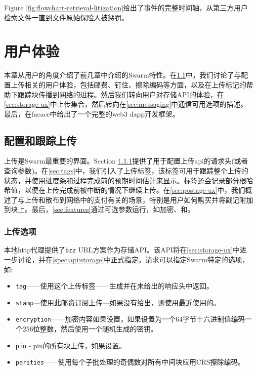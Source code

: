 Figure \ref{fig:flowchart-retrieval-litigation}给出了事件的完整时间轴，从第三方用户检索文件一直到文件原始保险人被惩罚。





\chapter{用户体验}\label{sec:ux}

本章从用户的角度介绍了前几章中介绍的Swarm特性。在\ref{sec:upload}中，我们讨论了与配置上传相关的用户体验，包括邮费、钉住、擦除编码等方面，以及在上传标记的帮助下跟踪块传播到网络的进程。然后我们转向用户对存储API的体验，在\ref{sec:storage-ux}中上传集合，然后转向在\ref{sec:messaging}中通信可用选项的描述。最后，在facace中给出了一个完整的web3 dapp开发框架。

\section{配置和跟踪上传\statusgreen}\label{sec:upload}

\green{}

上传是Swarm最重要的界面。Section \ref{sec:headers}提供了用于配置上传api的请求头(或者查询参数)。在\ref{sec:tags}中，我们引入了上传标签，该标签可用于跟踪整个上传的状态，并使用进度条和过程完成前的预期时间估计来显示。标签还会记录部分根哈希值，以便在上传完成前被中断的情况下继续上传。在\ref{sec:postage-ux}中，我们概述了与上传和散布到网络中的支付有关的场景，特别是用户如何购买并将戳记附加到块上。最后，\ref{sec:features}通过可选参数运行，如加密、和。

\subsection{上传选项\statusgreen}\label{sec:headers}

本地http代理提供了\lstinline{bzz} URL方案作为存储API。该API将在\ref{sec:storage-ux}中进一步讨论，并在\ref{spec:api:storage}中正式指定。请求可以指定Swarm特定的选项，如:

\begin{itemize}
\item \lstinline{tag}——使用这个上传标签——生成并在未给出的响应头中返回。 
\item \lstinline{stamp}—使用此邮资订阅上传—如果没有给出，则使用最近使用的。 
\item \lstinline{encryption}——加密内容如果设置，如果设置为一个64字节十六进制值编码一个256位整数，然后使用一个随机生成的密钥。 
\item \lstinline{pin} - pin的所有块上传，如果设置。 
\item \lstinline{parities}——使用每个子批处理的奇偶数对所有中间块应用CRS擦除编码。
\end{itemize}

